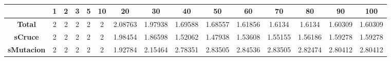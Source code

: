 \begin{table}[]
\begin{tabular}{|c|c|c|c|c|c|c|c|c|c|c|c|c|c|c|}
\hline
\multicolumn{1}{|l|}{} & \textbf{1}               & \textbf{2}               & \textbf{3}               & \textbf{5}               & \textbf{10}              & \textbf{20}                    & \textbf{30}                    & \textbf{40}                    & \textbf{50}                    & \textbf{60}                    & \textbf{70}                    & \textbf{80}                    & \textbf{90}                    & \textbf{100}                   \\ \hline
\textbf{Total}         & {\color[HTML]{4169E1} 2} & {\color[HTML]{4169E1} 2} & {\color[HTML]{4169E1} 2} & {\color[HTML]{4169E1} 2} & {\color[HTML]{4169E1} 2} & 2.08763                        & 1.97938                        & 1.69588                        & 1.68557                        & 1.61856                        & 1.6134                         & 1.6134                         & 1.60309                        & 1.60309                        \\ \hline
\textbf{sCruce}        & {\color[HTML]{4169E1} 2} & {\color[HTML]{4169E1} 2} & {\color[HTML]{4169E1} 2} & {\color[HTML]{4169E1} 2} & {\color[HTML]{4169E1} 2} & 1.98454                        & {\color[HTML]{4169E1} 1.86598} & {\color[HTML]{4169E1} 1.52062} & {\color[HTML]{4169E1} 1.47938} & {\color[HTML]{4169E1} 1.53608} & {\color[HTML]{4169E1} 1.55155} & {\color[HTML]{4169E1} 1.56186} & {\color[HTML]{4169E1} 1.59278} & {\color[HTML]{4169E1} 1.59278} \\ \hline
\textbf{sMutacion}     & {\color[HTML]{4169E1} 2} & {\color[HTML]{4169E1} 2} & {\color[HTML]{4169E1} 2} & {\color[HTML]{4169E1} 2} & {\color[HTML]{4169E1} 2} & {\color[HTML]{4169E1} 1.92784} & 2.15464                        & 2.78351                        & 2.83505                        & 2.84536                        & 2.83505                        & 2.82474                        & 2.80412                        & 2.80412                        \\ \hline
\end{tabular}
\caption{\label{table:HISTORICO}}
\end{table}